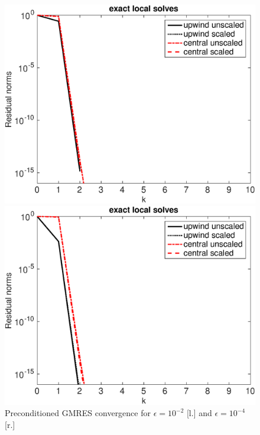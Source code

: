 \begin{figure}[tbhp]
\begin{minipage}[t]{0.48\linewidth}
\includegraphics[width=0.98\linewidth]{figures/gmres_eps_1e-02_N_198_prec}
\end{minipage}
%
\begin{minipage}[t]{0.48\linewidth}
\includegraphics[width=0.98\linewidth]{figures/gmres_eps_1e-04_N_198_prec}
\end{minipage}
\caption{Preconditioned GMRES convergence for $\epsilon=10^{-2}$ [l.] and $\epsilon=10^{-4}$ [r.]}
\label{fig:1D:GMRES.N198.eps6.prec}
\end{figure}
